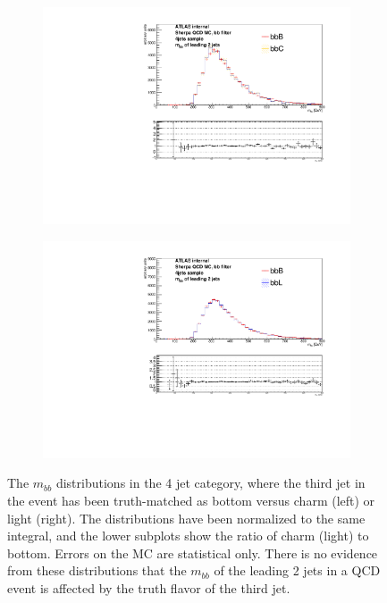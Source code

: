 \begin{figure}[phtb!]
  \begin{center}
  \begin{subfigure}[$BBB$ vs $BBC$, 4 jet category]{0.45\textwidth}\includegraphics[width=\textwidth]{MonteCarlo/figures/mbb_bbB_4jets_bbB_bbC.pdf}\end{subfigure}
  \begin{subfigure}[$BBB$ vs $BBL$, 4 jet category]{0.45\textwidth}\includegraphics[width=\textwidth]{MonteCarlo/figures/mbb_bbB_4jets_bbB_bbL.pdf}\end{subfigure}
  \caption{The $m_{bb}$ distributions in the 4 jet category, where the third jet in the event has been 
  truth-matched as bottom versus charm (left) or light (right).  The distributions have been normalized to 
  the same integral, and the lower subplots show the ratio of charm (light) to bottom.  Errors on the MC
  are statistical only.  There is no evidence from these distributions that the $m_{bb}$ of the leading
  2 jets in a QCD event is affected by the truth flavor of the third jet. 
  \label{fig:mbb_bb_qcd_mc}}
    \end{center}
\end{figure}






